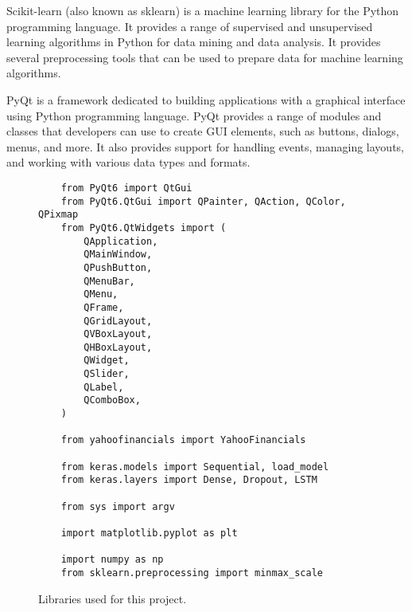 \par
Scikit-learn (also known as sklearn) is a machine learning library for the Python programming language. It provides a range of supervised and unsupervised learning algorithms in Python for data mining and data analysis. It provides several preprocessing tools that can be used to prepare data for machine learning algorithms.
\par
PyQt is a framework dedicated to building applications with a graphical interface using Python programming language. PyQt provides a range of modules and classes that developers can use to create GUI elements, such as buttons, dialogs, menus, and more. It also provides support for handling events, managing layouts, and working with various data types and formats.
\clearpage
\begin{figure}
\centering
\begin{lstlisting}
    from PyQt6 import QtGui
    from PyQt6.QtGui import QPainter, QAction, QColor, QPixmap
    from PyQt6.QtWidgets import (
        QApplication,
        QMainWindow,
        QPushButton,
        QMenuBar,
        QMenu,
        QFrame,
        QGridLayout,
        QVBoxLayout,
        QHBoxLayout,
        QWidget,
        QSlider,
        QLabel,
        QComboBox,
    )
    
    from yahoofinancials import YahooFinancials
    
    from keras.models import Sequential, load_model
    from keras.layers import Dense, Dropout, LSTM
    
    from sys import argv
    
    import matplotlib.pyplot as plt
    
    import numpy as np
    from sklearn.preprocessing import minmax_scale
\end{lstlisting}
\caption{Libraries used for this project.}
\label{fig:pseudocode:listings}
\end{figure}

